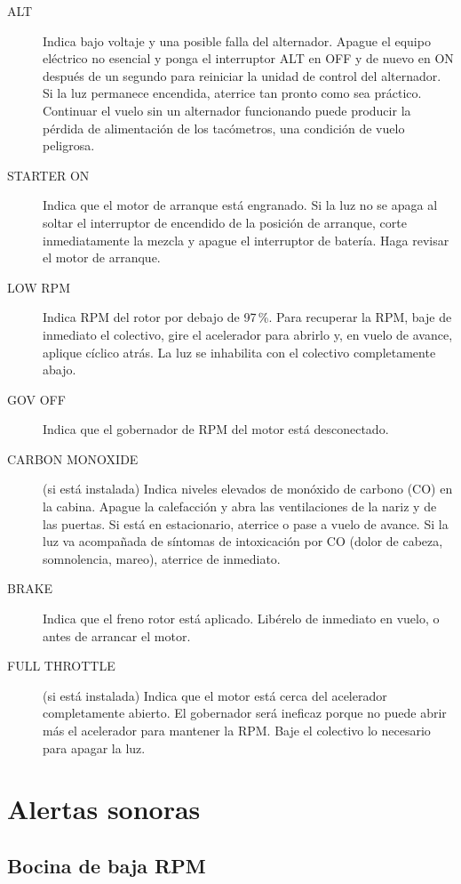 \begin{description}
\item[\textsf{ALT}] Indica bajo voltaje y una posible falla del alternador. Apague el equipo eléctrico no esencial y ponga el interruptor \textsf{ALT} en OFF y de nuevo en ON después de un segundo para reiniciar la unidad de control del alternador. Si la luz permanece encendida, aterrice tan pronto como sea práctico. Continuar el vuelo sin un alternador funcionando puede producir la pérdida de alimentación de los tacómetros, una condición de vuelo peligrosa.
\item[\textsf{STARTER ON}] Indica que el motor de arranque está engranado. Si la luz no se apaga al soltar el interruptor de encendido de la posición de arranque, corte inmediatamente la mezcla y apague el interruptor de batería. Haga revisar el motor de arranque.
\item[\textsf{LOW RPM}] Indica RPM del rotor por debajo de 97\,\%. Para recuperar la RPM, baje de inmediato el colectivo, gire el acelerador para abrirlo y, en vuelo de avance, aplique cíclico atrás. La luz se inhabilita con el colectivo completamente abajo.
\item[\textsf{GOV OFF}] Indica que el gobernador de RPM del motor está desconectado.
\item[\textsf{CARBON MONOXIDE}] (si está instalada) Indica niveles elevados de monóxido de carbono (CO) en la cabina. Apague la calefacción y abra las ventilaciones de la nariz y de las puertas. Si está en estacionario, aterrice o pase a vuelo de avance. Si la luz va acompañada de síntomas de intoxicación por CO (dolor de cabeza, somnolencia, mareo), aterrice de inmediato.
\item[\textsf{BRAKE}] Indica que el freno rotor está aplicado. Libérelo de inmediato en vuelo, o antes de arrancar el motor.
\item[\textsf{FULL THROTTLE}] (si está instalada) Indica que el motor está cerca del acelerador completamente abierto. El gobernador será ineficaz porque no puede abrir más el acelerador para mantener la RPM. Baje el colectivo lo necesario para apagar la luz.
\end{description}

\section{Alertas sonoras}

\subsection{Bocina de baja RPM}

